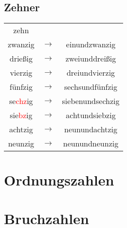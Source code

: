 \documentclass[main.tex]{subfiles}
\begin{document}
\begin{minipage}{0,5\textwidth}
\subsection{Zehner}
\begin{tabular}{ccc}
zehn &  &  \\ 
zwanzig & $\rightarrow$ & einundzwanzig \\ 
drießig & $\rightarrow$ & zweiunddreißig \\ 
vierzig & $\rightarrow$ & dreiundvierzig \\ 
fünfzig & $\rightarrow$ & sechsundfünfzig \\ 
se\textcolor{red}{chz}ig & $\rightarrow$ & siebenundsechzig \\ 
sie\textcolor{red}{bz}ig & $\rightarrow$ & achtundsiebzig \\ 
achtzig & $\rightarrow$ & neunundachtzig \\ 

neunzig & $\rightarrow$ & neunundneunzig \\ 

\end{tabular} 
\end{minipage}

\section{Ordnungszahlen}

\section{Bruchzahlen}
\end{document}
